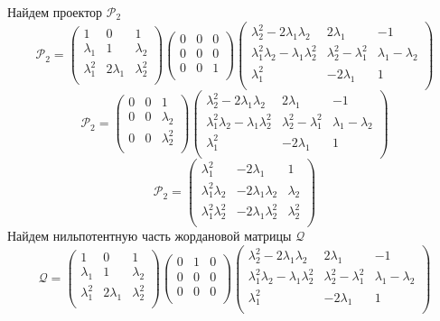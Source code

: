 Найдем проектор $\mathcal{P}_2$
$$
\mathcal{P}_2 = 
\begin{pmatrix}
  	1 & 0 & 1\\
  	\lambda_1 & 1 & \lambda_2 \\
  	\lambda_1^2 & 2\lambda_1 & \lambda_2^2 \\
\end{pmatrix}
 \begin{pmatrix}
  	0 & 0 & 0\\
  	0 & 0 & 0 \\
  	0 & 0 & 1 \\
\end{pmatrix}
\begin{pmatrix}
  	\lambda_2^2-2\lambda_1\lambda_2 & 2\lambda_1 & -1  \\
  	\lambda_1^2\lambda_2 - \lambda_1\lambda_2^2 & \lambda_2^2 - \lambda_1^2 & \lambda_1 - \lambda_2  \\
  	\lambda_1^2 & -2\lambda_1 & 1  \\
 \end{pmatrix} 	
$$
$$
\mathcal{P}_2 = 
\begin{pmatrix}
  	0 & 0 & 1\\
  	0 & 0 & \lambda_2 \\
  	0 & 0 & \lambda_2^2 \\
\end{pmatrix}
\begin{pmatrix}
  	\lambda_2^2-2\lambda_1\lambda_2 & 2\lambda_1 & -1  \\
  	\lambda_1^2\lambda_2 - \lambda_1\lambda_2^2 & \lambda_2^2 - \lambda_1^2 & \lambda_1 - \lambda_2  \\
  	\lambda_1^2 & -2\lambda_1 & 1  \\
 \end{pmatrix} 
$$
$$
\mathcal{P}_2 = 
\begin{pmatrix}
  	\lambda_1^2 & -2\lambda_1 & 1  \\
  	\lambda_1^2\lambda_2 & -2\lambda_1\lambda_2 & \lambda_2  \\
  	\lambda_1^2\lambda_2^2 & -2\lambda_1\lambda_2^2 & \lambda_2^2  \\
 \end{pmatrix} 
$$
Найдем нильпотентную часть жордановой матрицы $\mathcal{Q}$
$$
\mathcal{Q}=
\begin{pmatrix}
  	1 & 0 & 1\\
  	\lambda_1 & 1 & \lambda_2 \\
  	\lambda_1^2 & 2\lambda_1 & \lambda_2^2 \\
\end{pmatrix}
 \begin{pmatrix}
  	0 & 1 & 0\\
  	0 & 0 & 0 \\
  	0 & 0 & 0 \\
\end{pmatrix}
\begin{pmatrix}
  	\lambda_2^2-2\lambda_1\lambda_2 & 2\lambda_1 & -1  \\
  	\lambda_1^2\lambda_2 - \lambda_1\lambda_2^2 & \lambda_2^2 - \lambda_1^2 & \lambda_1 - \lambda_2  \\
  	\lambda_1^2 & -2\lambda_1 & 1  \\
 \end{pmatrix}
$$
